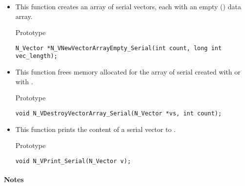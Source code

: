 \begin{itemize}
\item {}

 This function creates an array of  serial vectors, each with an empty ()
 data array.

 Prototype

 \verb|N_Vector *N_VNewVectorArrayEmpty_Serial(int count, long int vec_length);|


\item {}

 This function frees memory allocated for the array of  serial  
 created with  or with .

 Prototype

 \verb|void N_VDestroyVectorArray_Serial(N_Vector *vs, int count);|


\item {}

 This function prints the content of a serial vector to .

 Prototype
 
 \verb|void N_VPrint_Serial(N_Vector v);|

\end{itemize}
\paragraph{\bf Notes}                                                      
           
